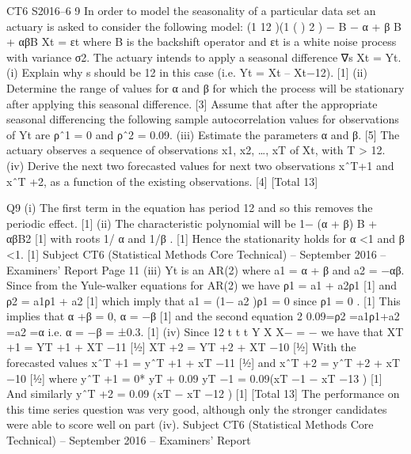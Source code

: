 CT6 S2016–6
9 In order to model the seasonality of a particular data set an actuary is asked to
consider the following model:
  (1 12 )(1 ( ) 2 ) − B − α + β B + αβB Xt = εt
where B is the backshift operator and εt is a white noise process with variance σ2.
The actuary intends to apply a seasonal difference ∇s Xt = Yt.
(i) Explain why s should be 12 in this case (i.e. Yt = Xt – Xt−12). [1]
(ii) Determine the range of values for α and β for which the process will be
stationary after applying this seasonal difference. [3]
Assume that after the appropriate seasonal differencing the following sample
autocorrelation values for observations of Yt are ρˆ1 = 0 and ρˆ2 = 0.09.
(iii) Estimate the parameters α and β. [5]
The actuary observes a sequence of observations x1, x2, …, xT of Xt, with T > 12.
(iv) Derive the next two forecasted values for next two observations xˆT+1 and
xˆT +2, as a function of the existing observations. [4]
[Total 13]

  Q9 (i) The first term in the equation has period 12 and so this removes the periodic
effect. [1]
(ii) The characteristic polynomial will be 1− (α + β) B + αβB2 [1]
with roots 1/ α and 1/β . [1]
Hence the stationarity holds for α <1 and β <1. [1]
Subject CT6 (Statistical Methods Core Technical) – September 2016 – Examiners’ Report
Page 11
(iii) Yt is an AR(2) where a1 = α + β and a2 = −αβ. Since from the Yule-walker
equations for AR(2) we have
ρ1 = a1 + a2ρ1 [1]
and
ρ2 = a1ρ1 + a2 [1]
which imply that a1 = (1− a2 )ρ1 = 0 since ρ1 = 0 . [1]
This implies that α +β = 0, α = −β [1]
and the second equation 2
0.09=ρ2 =a1ρ1+a2 =a2 =α i.e. α = −β = ±0.3. [1]
(iv) Since 12 t t t Y X X−
= − we have that
XT +1 = YT +1 + XT −11 [½]
XT +2 = YT +2 + XT −10 [½]
With the forecasted values
xˆT +1 = yˆT +1 + xT −11 [½]
and
xˆT +2 = yˆT +2 + xT −10 [½]
where
yˆT +1 = 0* yT + 0.09 yT −1 = 0.09(xT −1 − xT −13 ) [1]
And similarly
yˆT +2 = 0.09 (xT − xT −12 ) [1]
[Total 13]
The performance on this time series question was very good, although only
the stronger candidates were able to score well on part (iv).
Subject CT6 (Statistical Methods Core Technical) – September 2016 – Examiners’ Report
